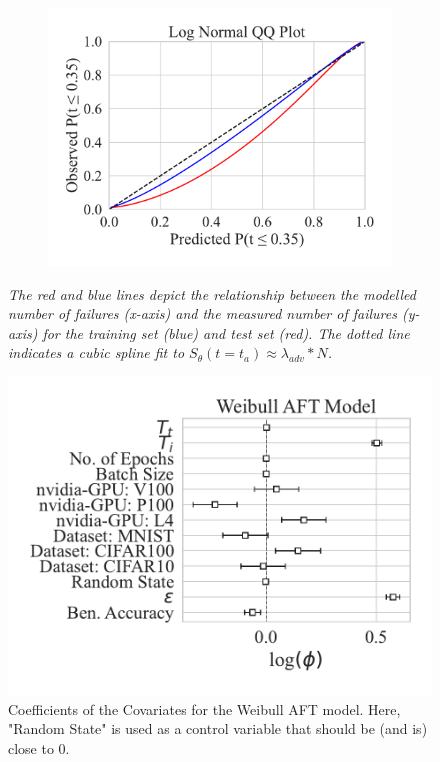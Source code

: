 \documentclass[conference]{IEEEtran}
\newcommand{\cm}[1]{\textit{{\color{blue}#1}}}
\begin{document}
\begin{figure}[h!]
\begin{subfigure}[b]{.3\linewidth}
        \includegraphics[width=\linewidth,clip]{plots/combined/log_normal_qq.pdf}
        \caption{}
    \end{subfigure}
    \caption{\cm{The red and blue lines depict the relationship between the modelled number of failures (x-axis) and the measured number of failures (y-axis) for the training set (blue) and test set (red). The dotted line indicates a cubic spline fit to $S_{\theta}(t=t_a) \approx \lambda_{adv} * N $.}}
    \label{fig:qq}
\end{figure}
\begin{figure}[h!]
    \centering
    \captionsetup[subfigure]{skip=0pt} %
        \centering
        \includegraphics[width=.5\textwidth]{plots/combined/weibull_aft.pdf}
        \caption{Coefficients of the Covariates for the Weibull AFT model. Here, "Random State" is used as a control variable that should be (and is) close to 0.}
        \label{fig:aft}
\end{figure}
\end{document}

